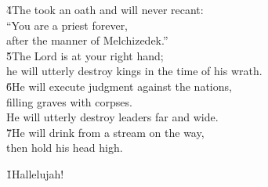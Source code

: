 \begin{poetry}
\poeml \v{4}The  took an oath and will never recant: \\
\poemll    ``You are a priest forever, \\
\poemlll       after the manner of Melchizedek.'' \\
\poeml \v{5}The Lord is at your right hand; \\
\poemll    he will utterly destroy kings in the time of his wrath. \\
\poeml \v{6}He will execute judgment against the nations, \\
\poemll    filling graves with corpses. \\
\poemlll       He will utterly destroy leaders far and wide. \\
\poeml \v{7}He will drink from a stream on the way, \\
\poemll    then hold his head high.
\end{poetry}

\begin{poetry}
\poeml \v{1}Hallelujah!
\end{poetry}

